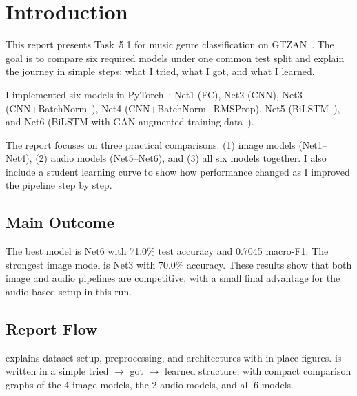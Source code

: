 \section{Introduction}
\label{sec:intro}

This report presents Task~5.1 for music genre classification on GTZAN~\cite{tzanetakis2002gtzan}. The goal is to compare six required models under one common test split and explain the journey in simple steps: what I tried, what I got, and what I learned.

I implemented six models in PyTorch~\cite{paszke2019pytorch}: Net1 (FC), Net2 (CNN), Net3 (CNN+BatchNorm~\cite{ioffe2015batchnorm}), Net4 (CNN+BatchNorm+RMSProp), Net5 (BiLSTM~\cite{hochreiter1997lstm}), and Net6 (BiLSTM with GAN-augmented training data~\cite{goodfellow2014gan}).

The report focuses on three practical comparisons: (1) image models (Net1--Net4), (2) audio models (Net5--Net6), and (3) all six models together. I also include a student learning curve to show how performance changed as I improved the pipeline step by step.

\subsection{Main Outcome}

The best model is Net6 with 71.0\% test accuracy and 0.7045 macro-F1. The strongest image model is Net3 with 70.0\% accuracy. These results show that both image and audio pipelines are competitive, with a small final advantage for the audio-based setup in this run.

\subsection{Report Flow}

 explains dataset setup, preprocessing, and architectures with in-place figures.  is written in a simple tried $\rightarrow$ got $\rightarrow$ learned structure, with compact comparison graphs of the 4 image models, the 2 audio models, and all 6 models.
